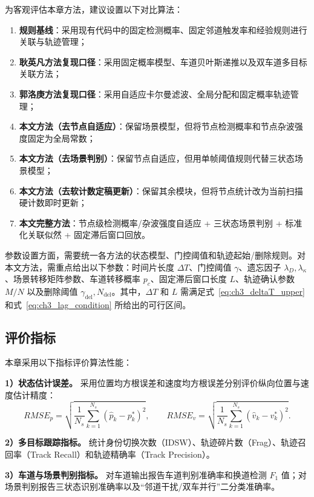 \documentclass{xdupgthesis}
\begin{document}
为客观评估本章方法，建议设置以下对比算法：
\begin{enumerate}
	\item \textbf{规则基线}：采用现有代码中的固定检测概率、固定邻道触发率和经验规则进行关联与轨迹管理；
	\item \textbf{耿英凡方法复现口径}：采用固定概率模型、车道贝叶斯递推以及双车道多目标关联方法；
	\item \textbf{郭洛庚方法复现口径}：采用自适应卡尔曼滤波、全局分配和固定概率轨迹管理；
	\item \textbf{本文方法（去节点自适应）}：保留场景模型，但将节点检测概率和节点杂波强度固定为全局常数；
	\item \textbf{本文方法（去场景判别）}：保留节点自适应，但用单帧阈值规则代替三状态场景模型；
	\item \textbf{本文方法（去软计数定稿更新）}：保留其余模块，但将节点统计改为当前扫描硬计数即时更新；
	\item \textbf{本文完整方法}：节点级检测概率/杂波强度自适应 + 三状态场景判别 + 标准化关联似然 + 固定滞后窗口回放。
\end{enumerate}

参数设置方面，需要统一各方法的状态模型、门控阈值和轨迹起始/删除规则。对本文方法，需重点给出以下参数：时间片长度 $\Delta T$、门控阈值 $\gamma$、遗忘因子 $\lambda_D,\lambda_{\kappa}$、场景转移矩阵参数、车道转移概率 $p_c$、固定滞后窗口长度 $L$、轨迹确认参数 $M/N$ 以及删除阈值 $\gamma_{\mathrm{del}},N_{\mathrm{del}}$。其中，$\Delta T$ 和 $L$ 需满足式~\eqref{eq:ch3_deltaT_upper} 和式~\eqref{eq:ch3_lag_condition} 所给出的可行区间。

\subsection{评价指标}

本章采用以下指标评价算法性能：

\textbf{1）状态估计误差。} 采用位置均方根误差和速度均方根误差分别评价纵向位置与速度估计精度：
\begin{equation}
	RMSE_p=
	\sqrt{\frac{1}{N_s}\sum_{k=1}^{N_s}(\hat p_k-p_k^{\ast})^2},
	\qquad
	RMSE_v=
	\sqrt{\frac{1}{N_s}\sum_{k=1}^{N_s}(\hat v_k-v_k^{\ast})^2}.
	\label{eq:ch3_rmse_v2}
\end{equation}

\textbf{2）多目标跟踪指标。} 统计身份切换次数（IDSW）、轨迹碎片数（Frag）、轨迹召回率（Track Recall）和轨迹精确率（Track Precision）。

\textbf{3）车道与场景判别指标。} 对车道输出报告车道判别准确率和换道检测 $F_1$ 值；对场景判别报告三状态识别准确率以及“邻道干扰/双车并行”二分类准确率。
\end{document}
